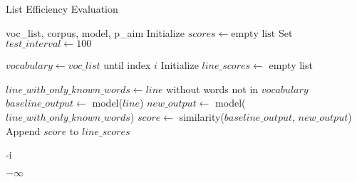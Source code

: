 \begin{algorithm}
\caption{List Efficiency Evaluation}
\label{alg:efficiency-evaluation}
\begin{algorithmic}[1]
\Require voc\_list, corpus, model, p\_aim
\State Initialize $scores \gets \text{empty list}$
\State Set $test\_interval \gets 100$

    \State $vocabulary \gets voc\_list$ until index $i$
    \State Initialize $line\_scores \gets$ empty list
    
        \State $line\_with\_only\_known\_words \gets line $ without words not in $vocabulary$
        \State $baseline\_output \gets$ model($line$)
        \State $new\_output \gets$ model($line\_with\_only\_known\_words$)
        \State $score \gets$ similarity($baseline\_output $, $new\_output$)
        \State Append $score$ to $line\_scores$
    \EndFor

       \State \Return -i
    \EndIf
\EndFor

\State \Return $-\infty$

\end{algorithmic}
\end{algorithm}
